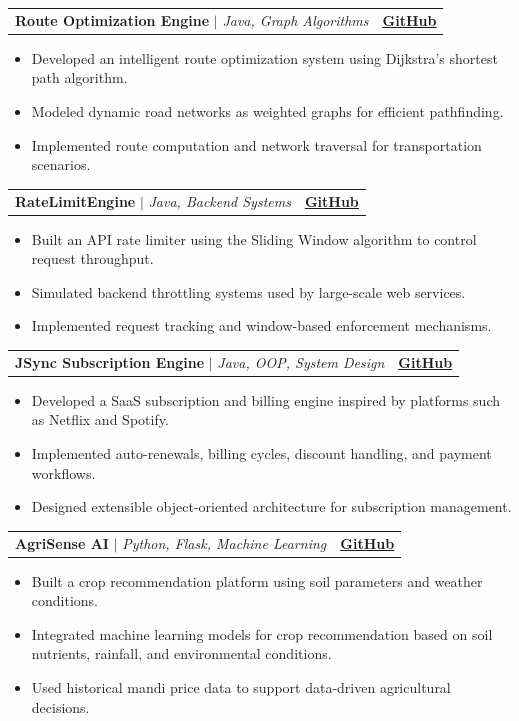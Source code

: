 \documentclass[letterpaper,11pt]{article}
\makeatletter
\newcommand{\resumeItem}[1]{
  \item\small{
    {#1 \vspace{-2pt}}
  }
}
\newcommand{\resumeProjectHeading}[2]{
    \item
    \begin{tabular*}{1.001\textwidth}{l@{\extracolsep{\fill}}r}
      \small#1 & \textbf{\small #2}\\
    \end{tabular*}\vspace{-7pt}
}
\newcommand{\resumeItemListStart}{\begin{itemize}}
\newcommand{\resumeItemListEnd}{\end{itemize}\vspace{-5pt}}
\makeatother
\begin{document}
\vspace{-10pt}

\resumeProjectHeading
{\textbf{Route Optimization Engine} $|$ \emph{Java, Graph Algorithms}}
{\href{https://github.com/RobinChahal0010/java-route-optimization-engine}{\underline{GitHub}}}
\resumeItemListStart
\resumeItem{Developed an intelligent route optimization system using Dijkstra's shortest path algorithm.}
\resumeItem{Modeled dynamic road networks as weighted graphs for efficient pathfinding.}
\resumeItem{Implemented route computation and network traversal for transportation scenarios.}
\resumeItemListEnd

\vspace{-10pt}

\resumeProjectHeading
{\textbf{RateLimitEngine} $|$ \emph{Java, Backend Systems}}
{\href{https://github.com/RobinChahal0010/RateLimitEngine-Java}{\underline{GitHub}}}
\resumeItemListStart
\resumeItem{Built an API rate limiter using the Sliding Window algorithm to control request throughput.}
\resumeItem{Simulated backend throttling systems used by large-scale web services.}
\resumeItem{Implemented request tracking and window-based enforcement mechanisms.}
\resumeItemListEnd

\vspace{-10pt}

\resumeProjectHeading
{\textbf{JSync Subscription Engine} $|$ \emph{Java, OOP, System Design}}
{\href{https://github.com/RobinChahal0010/JSync-Subscription-Engine}{\underline{GitHub}}}
\resumeItemListStart
\resumeItem{Developed a SaaS subscription and billing engine inspired by platforms such as Netflix and Spotify.}
\resumeItem{Implemented auto-renewals, billing cycles, discount handling, and payment workflows.}
\resumeItem{Designed extensible object-oriented architecture for subscription management.}
\resumeItemListEnd

\vspace{-10pt}

\resumeProjectHeading
{\textbf{AgriSense AI} $|$ \emph{Python, Flask, Machine Learning}}
{\href{https://github.com/RobinChahal0010/AgriSense-AI}{\underline{GitHub}}}
\resumeItemListStart
\resumeItem{Built a crop recommendation platform using soil parameters and weather conditions.}
\resumeItem{Integrated machine learning models for crop recommendation based on soil nutrients, rainfall, and environmental conditions.}
\resumeItem{Used historical mandi price data to support data-driven agricultural decisions.}
\resumeItemListEnd
\end{document}
